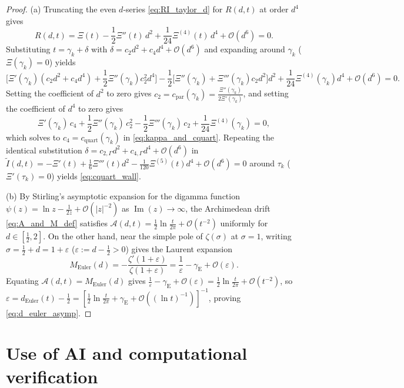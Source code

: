 \documentclass[11pt,a4paper,reqno]{amsart}
\theoremstyle{definition}
\theoremstyle{remark}
\numberwithin{equation}{section}
\newcommand{\Ima}{\operatorname{Im}}
\begin{document}
\begin{proof}
(a) Truncating the even $d$-series \eqref{eq:RI_taylor_d} for $R(d,t)$ at order $d^4$ gives
\[
R(d,t) = \Xi(t) - \frac{1}{2}\Xi''(t)\,d^2 + \frac{1}{24}\Xi^{(4)}(t)\,d^4 + \mathcal{O}(d^6) = 0.
\]
Substituting $t = \gamma_k + \delta$ with $\delta = c_2 d^2 + c_4 d^4 + \mathcal{O}(d^6)$ and expanding around $\gamma_k$ ($\Xi(\gamma_k) = 0$) yields
\[
\Big[\Xi'(\gamma_k)(c_2 d^2 + c_4 d^4) + \frac{1}{2}\Xi''(\gamma_k)c_2^2 d^4\Big] - \frac{1}{2}\Big[\Xi''(\gamma_k) + \Xi'''(\gamma_k)c_2 d^2\Big]d^2 + \frac{1}{24}\Xi^{(4)}(\gamma_k)d^4 + \mathcal{O}(d^6) = 0.
\]
Setting the coefficient of $d^2$ to zero gives $c_2 = c_{\mathrm{par}}(\gamma_k) = \frac{\Xi''(\gamma_k)}{2\Xi'(\gamma_k)}$, and setting the coefficient of $d^4$ to zero gives
\[
\Xi'(\gamma_k)\,c_4 + \frac{1}{2}\Xi''(\gamma_k)\,c_2^2 - \frac{1}{2}\Xi'''(\gamma_k)\,c_2 + \frac{1}{24}\Xi^{(4)}(\gamma_k) = 0,
\]
which solves to $c_4 = c_{\mathrm{quart}}(\gamma_k)$ in \eqref{eq:kappa_and_cquart}. Repeating the identical substitution $\delta = c_{2,\Gamma}d^2 + c_{4,\Gamma}d^4 + \mathcal{O}(d^6)$ in $\widetilde{I}(d,t) = -\Xi'(t) + \frac{1}{6}\Xi'''(t)d^2 - \frac{1}{120}\Xi^{(5)}(t)d^4 + \mathcal{O}(d^6) = 0$ around $\tau_k$ ($\Xi'(\tau_k) = 0$) yields \eqref{eq:cquart_wall}.

(b) By Stirling's asymptotic expansion for the digamma function $\psi(z) = \ln z - \frac{1}{2z} + \mathcal{O}(|z|^{-2})$ as $\Ima(z) \to \infty$, the Archimedean drift \eqref{eq:A_and_M_def} satisfies $\mathcal{A}(d,t) = \frac{1}{2}\ln\frac{t}{2\pi} + \mathcal{O}(t^{-2})$ uniformly for $d \in [\frac{1}{2}, 2]$. On the other hand, near the simple pole of $\zeta(\sigma)$ at $\sigma = 1$, writing $\sigma = \frac{1}{2} + d = 1 + \varepsilon$ ($\varepsilon := d - \frac{1}{2} > 0$) gives the Laurent expansion \cite[Section~2.1]{Titchmarsh1986}
\[
M_{\mathrm{Euler}}(d) = -\frac{\zeta'(1+\varepsilon)}{\zeta(1+\varepsilon)} = \frac{1}{\varepsilon} - \gamma_{\mathrm{E}} + \mathcal{O}(\varepsilon).
\]
Equating $\mathcal{A}(d,t) = M_{\mathrm{Euler}}(d)$ gives $\frac{1}{\varepsilon} - \gamma_{\mathrm{E}} + \mathcal{O}(\varepsilon) = \frac{1}{2}\ln\frac{t}{2\pi} + \mathcal{O}(t^{-2})$, so $\varepsilon = d_{\mathrm{Euler}}(t) - \frac{1}{2} = [\frac{1}{2}\ln\frac{t}{2\pi} + \gamma_{\mathrm{E}} + \mathcal{O}((\ln t)^{-1})]^{-1}$, proving \eqref{eq:d_euler_asymp}.
\end{proof}

\section*{Use of AI and computational verification}
\end{document}
